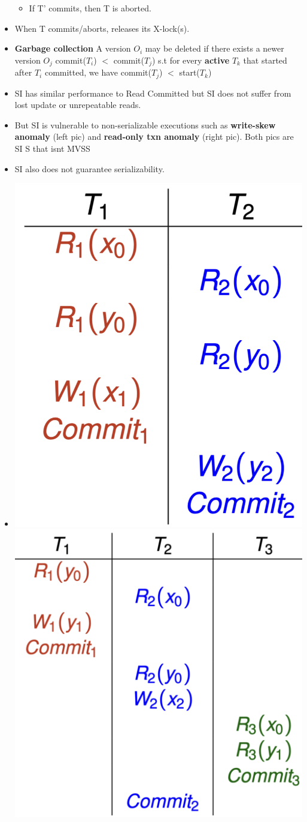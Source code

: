 \documentclass[9pt, landscape]{extarticle}
\begin{document}
\begin{multicols*}{4}
\begin{itemize}
\begin{itemize}
      \item If T' commits, then T is aborted.
    \end{itemize}
    \item When T commits/aborts, releases its X-lock(s).
    \item \textbf{Garbage collection} A version $O_i$ may be deleted if there exists a newer version $O_j$ commit($T_i$) $<$ commit($T_j$) s.t for every \textbf{active} $T_k$ that started after $T_i$ committed, we have commit($T_j$) $<$ start($T_k$)
    \item SI has similar performance to Read Committed but SI does not suffer from lost update or unrepeatable reads.
    \item But SI is vulnerable to non-serializable executions such as \textbf{write-skew anomaly} (left pic) and \textbf{read-only txn anomaly} (right pic). Both pics are SI S that isnt MVSS
    \item SI also does not guarantee serializability.
    \item \includegraphics[width=0.4\linewidth]{cs3223-write-skew-anomaly.png} \includegraphics[width=0.4\linewidth]{cs3223-read-only-txn-anomaly.png}
  \end{itemize}


\end{multicols*}
\end{document}
